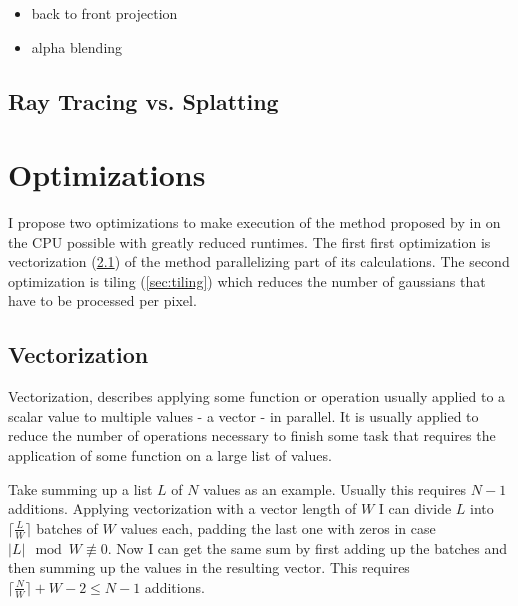 \documentclass[a4paper, 11pt]{memoir}
\begin{document}
    \begin{itemize}
        \item back to front projection
        \item alpha blending
    \end{itemize}

    \section{Ray Tracing vs. Splatting}

    \chapter{Optimizations}
    \label{ch:optimizations}
    I propose two optimizations to make execution of the method proposed by \citeauthor{Rhodin:2015}
    in \cite{Rhodin:2015} on the CPU possible with greatly reduced runtimes.
    The first first optimization is vectorization (\ref{sec:vectorization}) of the method
    parallelizing part of its calculations.
    The second optimization is tiling (\ref{sec:tiling}) which reduces the number of gaussians
    that have to be processed per pixel.

    \section{Vectorization}
    \label{sec:vectorization}
    Vectorization, describes applying some function or operation usually applied to a scalar value
    to multiple values - a vector - in parallel.
    It is usually applied to reduce the number of operations necessary to finish some task that
    requires the application of some function on a large list of values.

    Take summing up a list $L$ of $N$ values as an example. Usually this requires $N - 1$ additions.
    Applying vectorization with a vector length of $W$ I can divide $L$ into $\lceil \frac{L}{W} \rceil$
    batches of $W$ values each, padding the last one with zeros in case $|L| \mod W \not\equiv 0$. Now I
    can get the same sum by first adding up the batches and then summing up the values in the resulting
    vector. This requires $\lceil \frac{N}{W} \rceil + W - 2 \leq N - 1$ additions.
\end{document}
